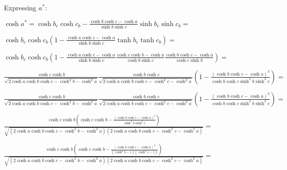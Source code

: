 \documentclass[a4paper,10pt]{article}
\begin{document}
Expressing $a^{*}$:

\begin{center}
$\cosh{a^{*}} = \cosh{b_c}\cosh{c_b} - \frac{\cosh{b}\cosh{c} - \cosh{a}}{\sinh{b}\sinh{c}}\sinh{b_c}\sinh{c_b} = $

$\cosh{b_c}\cosh{c_b}\left(1 - \frac{\cosh{a}\cosh{c} - \cosh{a}}{\sinh{b}\sinh{c}}\tanh{b_c}\tanh{c_b}\right) = $

$\cosh{b_c}\cosh{c_b}\left(1 - \frac{\cosh{a}\cosh{c} - \cosh{a}}{\sinh{b}\sinh{c}}  \frac{\cosh{c}\cosh{b} - \cosh{a}}{\cosh{b}\sinh{c}} \frac{\cosh{b}\cosh{c} - \cosh{a}}{\cosh{c}\sinh{b}}    \right) =$

$\frac{\cosh{c}\cosh{b}}{\sqrt{2\cosh{a}\cosh{b}\cosh{c} - \cosh^2{b} - \cosh^2{a}}}\frac{\cosh{b}\cosh{c}}{\sqrt{2\cosh{a}\cosh{b}\cosh{c} - \cosh^2{c} - \cosh^2{a}}}\left(1 - \frac{\left(\cosh{b}\cosh{c} - \cosh{a}\right)^3  }{\cosh{b}\cosh{c}\sinh^2{b}\sinh^2{c}}\right) =$

$\frac{\cosh{c}\cosh{b}}{\sqrt{2\cosh{a}\cosh{b}\cosh{c} - \cosh^2{b} - \cosh^2{a}}}\frac{\cosh{b}\cosh{c}}{\sqrt{2\cosh{a}\cosh{b}\cosh{c} - \cosh^2{c} - \cosh^2{a}}}\left(1 - \frac{\left(\cosh{b}\cosh{c} - \cosh{a}\right)^3  }{\cosh{b}\cosh{c}\sinh^2{b}\sinh^2{c}}\right) =$


$\frac{\cosh{c}\cosh{b}\left(\cosh{c}\cosh{b} - \frac{\left(\cosh{b}\cosh{c} - \cosh{a}\right)^3}{\sinh^2{b}\sinh^2{c}}\right)}{\sqrt{\left(2\cosh{a}\cosh{b}\cosh{c} - \cosh^2{b} - \cosh^2{a}\right)\left(2\cosh{a}\cosh{b}\cosh{c} - \cosh^2{c} - \cosh^2{a}\right)}} =$

$\frac{\cosh{c}\cosh{b}\left(\cosh{c}\cosh{b} - \frac{\left(\cosh{b}\cosh{c} - \cosh{a}\right)^3}{ \left( \cosh^2{b}-1\right)\left(\cosh^2{c} -1\right) }\right)}{\sqrt{\left(2\cosh{a}\cosh{b}\cosh{c} - \cosh^2{b} - \cosh^2{a}\right)\left(2\cosh{a}\cosh{b}\cosh{c} - \cosh^2{c} - \cosh^2{a}\right)}} =$

\end{center}
\end{document}

